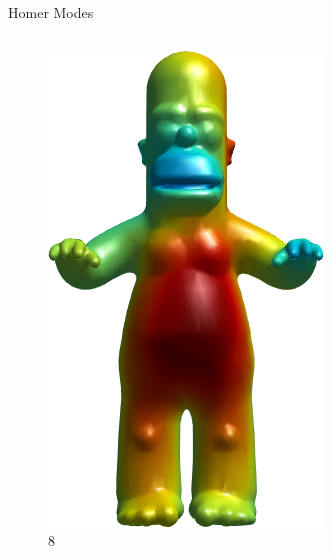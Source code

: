 \documentclass{beamer}
\begin{document}
\begin{frame}{Homer Modes}
\begin{columns}
\begin{column}[T]{3cm}
\begin{figure}[t]
    \includegraphics[width=\textwidth]{Harmonics/HomerModes/8.png}
    \caption*{\huge 8}
\end{figure}
\end{column}
\end{columns}

\end{frame}
\end{document}
